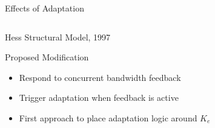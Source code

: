 \documentclass[10pt]{beamer}
\begin{document}
\begin{frame}[fragile]{Effects of Adaptation}
\begin{columns}[T]
\begin{column}{\textwidth}
    \end{column}
  \end{columns}
\end{frame}

\begin{frame}[fragile]{Hess Structural Model, 1997~\cite{Hess1997}}
  \begin{center}
  \end{center}
\end{frame}

\begin{frame}[fragile]{Proposed Modification}
  \begin{itemize}
    \setlength\itemsep{1em}
    \item Respond to concurrent bandwidth feedback
    \item Trigger adaptation when feedback is active
    \item First approach to place adaptation logic around $K_e$
  \end{itemize}
\end{frame}
\end{document}
